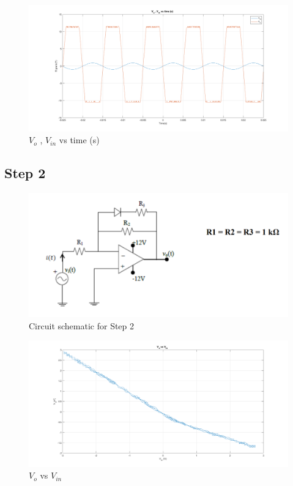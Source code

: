\documentclass[letterpaper,12pt]{article}
\begin{document}
\begin{figure}[H]
	\centering
   \includegraphics[width=1\textwidth]{1c_2.png}
   \caption{\(V_{o}\) , \(V_{in}\) vs time (s) }
\end{figure}

\subsection{Step 2}
\begin{figure}[H]
	\centering
   \includegraphics[width=1\textwidth]{circuit_2.png}
   \caption{Circuit schematic for Step 2}
\end{figure}

\begin{figure}[H]
	\centering
   \includegraphics[width=1\textwidth]{2_1.png}
   \caption{\(V_{o}\) vs \(V_{in}\)}
\end{figure}
\end{document}

